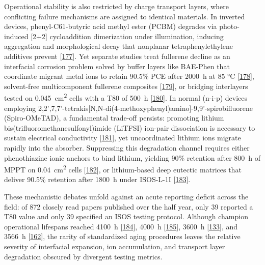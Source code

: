\documentclass[
  11pt,
]{article}
\begin{document}
Operational stability is also restricted by charge transport layers,
where conflicting failure mechanisms are assigned to identical
materials. In inverted devices, phenyl-C61-butyric acid methyl ester
(PCBM) degrades via photo-induced {[}2+2{]} cycloaddition dimerization
under illumination, inducing aggregation and morphological decay that
nonplanar tetraphenylethylene additives prevent
{[}\href{https://doi.org/10.1002/solr.70405}{177}{]}. Yet separate
studies treat fullerene decline as an interfacial corrosion problem
solved by buffer layers like BAE-Phen that coordinate migrant metal ions
to retain 90.5\% PCE after \qty{2000}{\hour} at 85 °C
{[}\href{https://doi.org/10.1002/adma.73529}{178}{]}, solvent-free
multicomponent fullerene composites
{[}\href{https://doi.org/10.1038/s41467-026-70022-0}{179}{]}, or
bridging interlayers tested on \qty{0.045}{\centi\meter\squared} cells
with a T80 of \qty{500}{\hour}
{[}\href{https://doi.org/10.1002/anie.9286497}{180}{]}. In normal
(n-i-p) devices employing
2,2',7,7'-tetrakis{[}N,N-di(4-methoxyphenyl)amino{]}-9,9'-spirobifluorene
(Spiro-OMeTAD), a fundamental trade-off persists: promoting lithium
bis(trifluoromethanesulfonyl)imide (LiTFSI) ion-pair dissociation is
necessary to sustain electrical conductivity
{[}\href{https://doi.org/10.1002/aenm.202506760}{181}{]}, yet
uncoordinated lithium ions migrate rapidly into the absorber.
Suppressing this degradation channel requires either phenothiazine ionic
anchors to bind lithium, yielding 90\% retention after \qty{800}{\hour}
of MPPT on \qty{0.04}{\centi\meter\squared} cells
{[}\href{https://doi.org/10.1002/adfm.76257}{182}{]}, or lithium-based
deep eutectic matrices that deliver 90.5\% retention after
\qty{1800}{\hour} under ISOS-L-1I
{[}\href{https://doi.org/10.1002/anie.9551164}{183}{]}.

These mechanistic debates unfold against an acute reporting deficit
across the field: of 872 closely read papers published over the half
year, only 39 reported a T80 value and only 39 specified an ISOS testing
protocol. Although champion operational lifespans reached
\qty{4100}{\hour} {[}\href{https://doi.org/10.1002/adfm.76110}{184}{]},
\qty{4000}{\hour} {[}\href{https://doi.org/10.1002/adfm.74893}{185}{]},
\qty{3600}{\hour}
{[}\href{https://doi.org/10.1021/acs.jpclett.6c01531}{133}{]}, and
\qty{3566}{\hour}
{[}\href{https://doi.org/10.1126/sciadv.aef6596}{162}{]}, the rarity of
standardized aging procedures leaves the relative severity of
interfacial expansion, ion accumulation, and transport layer degradation
obscured by divergent testing metrics.
\end{document}
